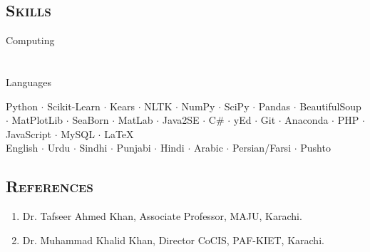 \documentclass[a4paper, 10pt]{article}
\begin{document}
\subsection*{\normalfont\textsc{\bf Skills}}
\hfill\begin{minipage}{0.17\textwidth}
Computing\textcolor{lightgray}{\dotfill}\\\\\\
Languages\textcolor{lightgray}{\dotfill}
\end{minipage}%
\begin{minipage}{0.8\textwidth}
Python $\cdot$ Scikit-Learn $\cdot$ Kears $\cdot$ NLTK $\cdot$ NumPy  $\cdot$ SciPy $\cdot$ Pandas $\cdot$ BeautifulSoup $\cdot$ MatPlotLib $\cdot$ SeaBorn $\cdot$ MatLab $\cdot$ Java2SE $\cdot$ C\# $\cdot$ yEd $\cdot$ Git $\cdot$ Anaconda $\cdot$ PHP $\cdot$ JavaScript $\cdot$ MySQL $\cdot$ \LaTeX\\
English $\cdot$ Urdu $\cdot$ Sindhi $\cdot$ Punjabi $\cdot$ Hindi $\cdot$ Arabic $\cdot$ Persian/Farsi $\cdot$ Pushto 
\end{minipage}

\subsection*{\normalfont\textsc{\bf References}}
\begin{enumerate}
\itemsep-4pt 
 \item Dr. Tafseer Ahmed Khan, Associate Professor, MAJU, Karachi.
 \item Dr. Muhammad Khalid Khan, Director CoCIS, PAF-KIET, Karachi.
\end{enumerate}
\end{document}
